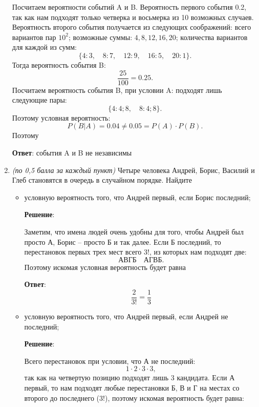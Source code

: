 \documentclass{article}
\begin{document}
\begin{enumerate}
    Посчитаем вероятности событий A и B. Вероятность первого события 0.2, так как нам подходят только четверка и восьмерка из 10 возможных случаев. Вероятность второго события получается из следующих соображений: всего вариантов пар $10^2$; возможные суммы: $4,8,12,16,20$; количества вариантов для каждой из сумм:
    \begin{equation}
        \{4:3,\quad8:7,\quad12:9,\quad16:5,\quad20:1\}.
    \end{equation}
    Тогда вероятность события B:
    \begin{equation}
        \frac{25}{100} = 0.25.
    \end{equation}
    Посчитаем вероятность события B, при условии A: подходят лишь следующие пары:
    \begin{equation}
        \{4:4;8,\quad 8:4;8\}.
    \end{equation}
    Поэтому условная вероятность:
    \begin{equation}
        P(B|A) = 0.04 \ne 0.05 = P(A)\cdot P(B).
    \end{equation}
    Поэтому

    \textbf{Ответ}:
    события A и B не независимы

    \item \textit{(по 0,5 балла за каждый пункт)} Четыре человека Андрей, Борис, Василий и Глеб
    становятся в очередь в случайном порядке. Найдите
    \begin{itemize}
        \item условную вероятность того, что Андрей первый, если Борис последний;
        
        \textbf{Решение}:

        Заметим, что имена людей очень удобны для того, чтобы Андрей был просто А, Борис -- просто Б и так далее. Если Б последний, то перестановок первых трех мест всего $3!$, из которых нам подходят две:
        \begin{equation}
            \text{АВГБ} \quad \text{АГВБ}.
        \end{equation}
        Поэтому искомая условная вероятность будет равна

        \textbf{Ответ}:
        $$\dfrac{2}{3!} = \dfrac{1}{3}$$

        \item условную вероятность того, что Андрей первый, если Андрей не последний;
                
        \textbf{Решение}:

        Всего перестановок при условии, что А не последний:
        \begin{equation}
            1\cdot 2\cdot 3\cdot 3,
        \end{equation}
        так как на четвертую позицию подходят лишь 3 кандидата. Если А первый, то нам подходят любые перестановки Б, В и Г на местах со второго до последнего ($3!$), поэтому искомая вероятность будет равна:


\end{itemize}
\end{enumerate}
\end{document}
